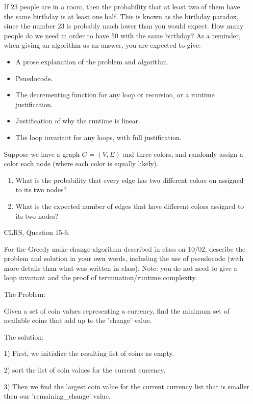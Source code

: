\documentclass{article}
\author{TODO-Your Group Number and Names Here}
\date{due: 18 October 2019}
\begin{document}
\nextprob
If 23 people are in a room, then the probability that at least two of them have
the same birthday is at least one half.  This is known as the birthday paradox,
since the number 23 is probably much lower than you would expect.  How many
people do we need in order to have 50%
with the same birthday?
As a reminder, when giving an algorithm as an answer, you
are expected to give:
\begin{itemize}
    \item A prose explanation of the problem and algorithm.
    \item Psuedocode.
    \item The decrementing function for any loop or recursion, or a runtime
        justification.
    \item Justification of why the runtime is linear.
    \item The loop invariant for any loops, with full justification.
\end{itemize}

\nextprob
Suppose we have a graph $G=(V,E)$ and three colors, and randomly assign a color
each node (where each color is equally likely).
\begin{enumerate}
    \item What is the probability that every edge has two different colors on
        assigned to its two nodes?
    \item What is the expected number of edges that have different colors
        assigned to its two nodes?
\end{enumerate}

\nextprob
CLRS, Question 15-6.

\nextprob
For the Greedy make change algorithm described in class on 10/02, describe the
problem and solution in your own words, including the use of pseudocode (with
more details than what was written in class).  Note: you do not need to give a
loop invariant and the proof of termination/runtime complexity.

The Problem:

Given a set of coin values representing a currency, find the minimum set of available coins that add up to the 'change' value.

The solution:

1) First, we initialize the resulting list of coins as empty.

2) sort the list of coin values for the current currency.

3) Then we find the largest coin value for the current currency list that is smaller then our 'remaining\_change' value.
\end{document}
